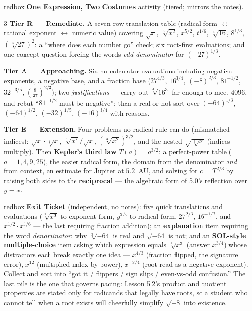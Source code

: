 \documentclass[10pt]{article}
\begin{document}
\begin{skillbox}{redbox}
\textbf{One Expression, Two Costumes} activity (tiered; mirrors the notes).
\begin{multicols}{3}
\textbf{Tier R --- Remediate.} A seven-row translation table (radical form $\leftrightarrow$ rational
exponent $\leftrightarrow$ numeric value) covering $\sqrt{x}$, $\sqrt[3]{x^{2}}$, $x^{5/2}$,
$t^{1/6}$, $\sqrt[4]{16}$, $8^{1/3}$, $\left(\sqrt[3]{27}\right)^{2}$; a ``where does each number
go'' check; six root-first evaluations; and one concept question forcing the words \emph{odd
denominator} for $(-27)^{1/3}$.

\columnbreak
\textbf{Tier A --- Approaching.} Six no-calculator evaluations including negative exponents,
a negative base, and a fraction base ($27^{4/3}$, $16^{3/4}$, $(-8)^{2/3}$, $81^{-1/2}$,
$32^{-3/5}$, $\left(\frac{8}{27}\right)^{2/3}$); two \emph{justifications} --- carry out
$\sqrt[4]{16^{3}}$ far enough to meet $4096$, and rebut ``$81^{-1/2}$ must be negative''; then a
real-or-not sort over $(-64)^{1/3}$, $(-64)^{1/2}$, $(-32)^{1/5}$, $(-16)^{3/4}$ with reasons.

\columnbreak
\textbf{Tier E --- Extension.} Four problems no radical rule can do (mismatched indices):
$\sqrt{x}\cdot\sqrt[4]{x}$, $\sqrt[3]{x^{2}}/\sqrt{x}$, $\left(\sqrt[3]{x^{2}}\right)^{3/2}$, and the
nested $\sqrt{\sqrt[3]{x}}$ (indices multiply). Then \textbf{Kepler's third law} $T(a)=a^{3/2}$: a
perfect-power table ($a=1,4,9,25$), the easier radical form, the domain from the denominator
\emph{and} from context, an estimate for Jupiter at $5.2$~AU, and solving for $a=T^{2/3}$ by raising
both sides to the \textbf{reciprocal} --- the algebraic form of 5.0's reflection over $y=x$.
\end{multicols}
\end{skillbox}

\begin{skillbox}{redbox}
\textbf{Exit Ticket} (independent, no notes): five quick translations and evaluations
($\sqrt[5]{x^{3}}$ to exponent form, $y^{3/4}$ to radical form, $27^{2/3}$, $16^{-1/2}$, and
$x^{1/2}\cdot x^{1/6}$ --- the last requiring fraction addition); an \textbf{explanation} item
requiring the word \emph{denominator}: why $\sqrt[3]{-64}$ is real and $\sqrt{-64}$ is not; and an
\textbf{SOL-style multiple-choice} item asking which expression equals $\sqrt[4]{x^{3}}$ (answer
$x^{3/4}$) whose distractors each break exactly one idea --- $x^{4/3}$ (fraction flipped, the
signature error), $x^{12}$ (multiplied index by power), $x^{-3/4}$ (root read as a negative
exponent). Collect and sort into ``got it / flippers / sign slips / even-vs-odd confusion.'' The
last pile is the one that governs pacing: Lesson 5.2's product and quotient properties are stated
only for radicands that legally have roots, so a student who cannot tell when a root exists will
cheerfully simplify $\sqrt{-8}$ into existence.
\end{skillbox}
\end{document}
